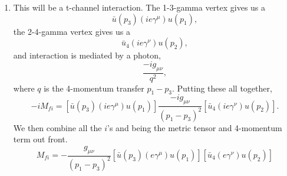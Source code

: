 \begin{enumerate}[label=\alph*)]
	\item This will be a t-channel interaction. The 1-3-gamma vertex gives us a 
	\begin{equation}
		\bar{u}(p_{3})(ie\gamma^{\mu}) u(p_{1}),
	\end{equation}
	the 2-4-gamma vertex gives us a 
	\begin{equation}
		\bar{u}_{4}(ie\gamma^{\nu})u(p_{2}),
	\end{equation}
	and interaction is mediated by a photon,
	\begin{equation}
	\dfrac{-ig_{\mu\nu}}{q^{2}},
	\end{equation}
	where \(q\) is the 4-momentum transfer \(p_{1}-p_{3}\). Putting these all together,
	\begin{equation}
	-iM_{fi}=\left[\bar{u}(p_{3})(ie\gamma^{\mu}) u(p_{1})\right]\dfrac{-ig_{\mu\nu}}{(p_{1}-p_{3})^{2}}\left[\bar{u}_{4}(ie\gamma^{\nu})u(p_{2})\right].
	\end{equation}
	We then combine all the \(i\)'s and being the metric tensor and 4-momentum term out front. 
	\begin{equation}
	M_{fi}=-\dfrac{g_{\mu\nu}}{(p_{1}-p_{3})^{2}}\left[\bar{u}(p_{3})(e\gamma^{\mu}) u(p_{1})\right]\left[\bar{u}_{4}(e\gamma^{\nu})u(p_{2})\right]
	\end{equation}
	

\end{enumerate}
